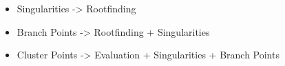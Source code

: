 
\begin{itemize}
  \item Singularities -> Rootfinding
  \item Branch Points -> Rootfinding + Singularities
  \item Cluster Points -> Evaluation + Singularities + Branch Points
\end{itemize}
